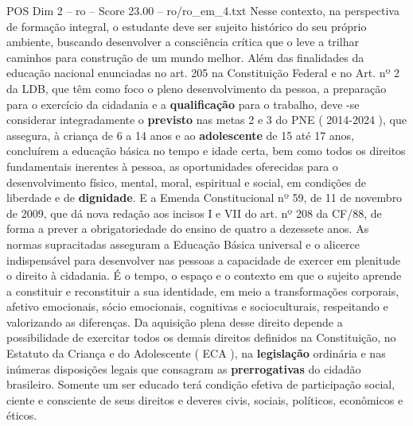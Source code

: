 \begin{textsample}{POS Dim 2 – ro – Score 23.00 – ro/ro\_em\_4.txt}
Nesse contexto, na perspectiva de formação integral, o estudante deve ser sujeito histórico do seu próprio ambiente, buscando desenvolver a consciência crítica que o leve a trilhar caminhos para construção de um mundo melhor.
Além das finalidades da educação nacional enunciadas no art. 205 na Constituição Federal e no Art. nº 2 da LDB, que têm como foco o pleno desenvolvimento da pessoa, a preparação para o exercício da cidadania e a \textbf{qualificação} para o trabalho, deve -se considerar integradamente o \textbf{previsto} nas metas 2 e 3 do PNE ( 2014-2024 ), que assegura, à criança de 6 a 14 anos e ao \textbf{adolescente} de 15 até 17 anos, concluírem a educação básica no tempo e idade certa, bem como todos os direitos fundamentais inerentes à pessoa, as oportunidades oferecidas para o desenvolvimento físico, mental, moral, espiritual e social, em condições de liberdade e de \textbf{dignidade}.
E a Emenda Constitucional nº 59, de 11 de novembro de 2009, que dá nova redação aos incisos I e VII do art. nº 208 da CF/88, de forma a prever a obrigatoriedade do ensino de quatro a dezessete anos.
As normas supracitadas asseguram a Educação Básica universal e o alicerce indispensável para desenvolver nas pessoas a capacidade de exercer em plenitude o direito à cidadania.
É o tempo, o espaço e o contexto em que o sujeito aprende a constituir e reconstituir a sua identidade, em meio a transformações corporais, afetivo emocionais, sócio emocionais, cognitivas e socioculturais, respeitando e valorizando as diferenças.
Da aquisição plena desse direito depende a possibilidade de exercitar todos os demais direitos definidos na Constituição, no Estatuto da Criança e do Adolescente ( ECA ), na \textbf{legislação} ordinária e nas inúmeras disposições legais que consagram as \textbf{prerrogativas} do cidadão brasileiro.
Somente um ser educado terá condição efetiva de participação social, ciente e consciente de seus direitos e deveres civis, sociais, políticos, econômicos e éticos.

\end{textsample}
